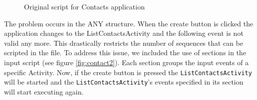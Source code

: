 \documentclass{acm_proc_article-sp}
\begin{document}
\begin{figure}
\vspace{-15pt}
\caption{Original script for Contacts application}
\label{fig:contact}
\end{figure}

The problem occurs in the ANY structure. When the create button is clicked the application changes to the ListContactsActivity
and the following event is not valid any more. This drastically restricts the number of sequences that can be scripted in the file. To
address this issue, we included the use of sections in the input script (see figure \ref{fig:contact2}). Each section groups the input
events of a specific Activity. Now, if the create button is pressed the \texttt{ListContactsActivity} will be started and the
\texttt{ListContactsActivity}'s events specified in its section will start executing again.
\end{document}
